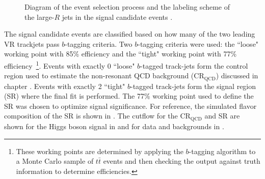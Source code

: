 \begin{figure}[!htbp]
  \centering
{}

  \caption{Diagram of the event selection process and the labeling scheme of the large-$R$ jets in the signal candidate events \cite{Feickert:2690521}.}
  \label{fig:event_selection}
\end{figure}

The signal candidate events are classified based on how many of the two leading
VR trackjets pass $b$-tagging criteria.  Two $b$-tagging criteria were used:
the ``loose" working point with 85\% efficiency and the ``tight" working point
with 77\% efficiency~\footnote{These working points are determined by applying
the $b$-tagging algorithm to a Monte Carlo sample of $t\bar{t}$ events and then
checking the output against truth information to determine efficiencies.}.
Events with exactly 0 ``loose" $b$-tagged track-jets form the control region
used to estimate the non-resonant QCD background ($\text{CR}_{\text{QCD}}$)
discussed in chapter .  Events with exactly 2 ``tight"
$b$-tagged track-jets form the signal region (SR) where the final fit is
performed.  The 77\% working point used to define the SR was chosen to optimize
signal significance.  For reference, the simulated flavor composition of the SR
is shown in . The cutflow for the
$\text{CR}_{\text{QCD}}$ and SR are shown for the Higgs boson signal in
 and for data and backgrounds in
.

